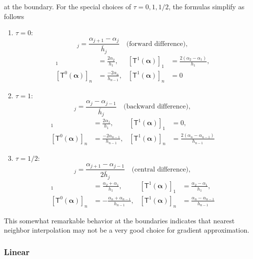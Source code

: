 \documentclass[a4paper]{paper}
\newcommand{\DISCOP}[1]{{\ensuremath{\mathsf{#1}}}}
\newcommand*{\DISCOPT}{\DISCOP{T}}
\newcommand*{\BDalpha}{\boldsymbol{\alpha}}
\begin{document}
%
at the boundary. For the special choices of $\tau=0, 1, 1/2$, the formulas simplify as follows
%
\begin{enumerate}
 \item $\tau=0$:
 \begin{equation*}
  [\DISCOPT(\BDalpha)]_j = \frac{\alpha_{j+1}  - \alpha_j}{\bar h_j} \quad \text{(forward difference)},
 \end{equation*}
 \begin{align*}
  [\DISCOPT^0(\BDalpha)]_1 
  &= \frac{2\alpha_2}{h_1}, &
  [\DISCOPT^1(\BDalpha)]_1 
  &= \frac{2(\alpha_2 - \alpha_1)}{h_1}, \\
  [\DISCOPT^0(\BDalpha)]_n
  &= \frac{-2\alpha_n}{h_{n-1}}, &
  [\DISCOPT^1(\BDalpha)]_n
  &= 0
 \end{align*}

 \item $\tau=1$:
 \begin{equation*}
  [\DISCOPT(\BDalpha)]_j = \frac{\alpha_j - \alpha_{j-1}}{\bar h_j} \quad \text{(backward difference)},
 \end{equation*}
 \begin{align*}
  [\DISCOPT^0(\BDalpha)]_1 
  &= \frac{2\alpha_1}{h_1}, &
  [\DISCOPT^1(\BDalpha)]_1 
  &= 0, \\
  [\DISCOPT^0(\BDalpha)]_n
  &= \frac{-2\alpha_{n-1}}{h_{n-1}}, &
  [\DISCOPT^1(\BDalpha)]_n
  &= \frac{2(\alpha_n - \alpha_{n-1})}{h_{n-1}}
 \end{align*}

 \item $\tau=1/2$:
 \begin{equation*}
  [\DISCOPT(\BDalpha)]_j = \frac{\alpha_{j+1} - \alpha_{j-1}}{2\bar h_j} \quad \text{(central difference)},
 \end{equation*}
 \begin{align*}
  [\DISCOPT^0(\BDalpha)]_1 
  &= \frac{\alpha_2 + \alpha_1}{h_1}, &
  [\DISCOPT^1(\BDalpha)]_1 
  &= \frac{\alpha_2 - \alpha_1}{h_1}, \\
  [\DISCOPT^0(\BDalpha)]_n
  &= -\frac{\alpha_n + \alpha_{n-1}}{h_{n-1}}, &
  [\DISCOPT^1(\BDalpha)]_n
  &= \frac{\alpha_n - \alpha_{n-1}}{h_{n-1}}
 \end{align*}
\end{enumerate}
%
This somewhat remarkable behavior at the boundaries indicates that nearest neighbor interpolation may not be a very 
good choice for gradient approximation.


\subsubsection{Linear}
\label{subsec:specif:deriv:linear}
\end{document}
